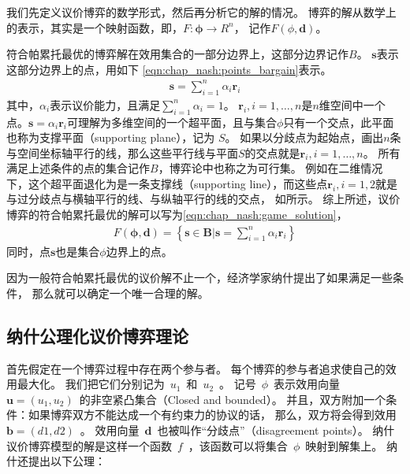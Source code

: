 我们先定义议价博弈的数学形式，然后再分析它的解的情况。
博弈的解从数学上的表示，其实是一个映射函数，即，$F: \mathbf{\phi} \rightarrow R^n$，
记作$F(\phi, \mathbf{d})$。

符合帕累托最优的博弈解在效用集合的一部分边界上，这部分边界记作$B$。
$\mathbf{s}$表示这部分边界上的点，用如下 \eqref{eqn:chap_nash:points_bargain}表示。
\begin{align}
 \mathbf{s} = \sum_{i=1}^n \alpha_i \mathbf{r}_i
    \label{eqn:chap_nash:points_bargain}
\end{align}
其中，$\alpha_i$表示议价能力，且满足$\sum_{i=1}^n \alpha_i = 1$。
$\mathbf{r}_i, i= 1,\dots,n$是$n$维空间中一个点。$\mathbf{s} = \alpha_i \mathbf{r}_i$可理解为多维空间的一个超平面，且与集合$\phi$只有一个交点，此平面也称为支撑平面（supporting plane），记为 $S$。
如果以分歧点为起始点，画出$n$条与空间坐标轴平行的线，那么这些平行线与平面$S$的交点就是$\mathbf{r}_i, i= 1,\dots,n$。
所有满足上述条件的点的集合记作$B$，博弈论中也称之为可行集。
例如在二维情况下，这个超平面退化为是一条支撑线（supporting line），而这些点$\mathbf{r}_i, i= 1,2$就是与过分歧点与横轴平行的线、与纵轴平行的线的交点，
如所示。
综上所述，议价博弈的符合帕累托最优的解可以写为\eqref{eqn:chap_nash:game_solution}，
\begin{align}
    F(\mathbf{\phi},\mathbf{d}) = \left\{ \mathbf{s} \in \mathbf{B} \big \vert \mathbf{s} = \sum_{i=1}^n \alpha_i \mathbf{r}_i \right\}
    \label{eqn:chap_nash:game_solution}
\end{align}
同时，点$\mathbf{s}$也是集合$\phi$边界上的点。

因为一般符合帕累托最优的议价解不止一个，经济学家纳什提出了如果满足一些条件，
那么就可以确定一个唯一合理的解\cite{Nash_1950}。

\subsection{纳什公理化议价博弈理论}
首先假定在一个博弈过程中存在两个参与者。
每个博弈的参与者追求使自己的效用最大化。
我们把它们分别记为~$u_1$~和~$u_2$~。
记号~$\phi$~表示效用向量~$\mathbf{u}=(u_1, u_2)$~的非空紧凸集合（Closed and bounded）。
并且，双方附加一个条件：如果博弈双方不能达成一个有约束力的协议的话，
那么，双方将会得到效用~$\mathbf{b}=(d1, d2)$~。
效用向量~$\mathbf{d}$~也被叫作“分歧点”（disagreement points）。
纳什议价博弈模型的解是这样一个函数~$f$~，该函数可以将集合~$\phi$~映射到解集上。
纳什还提出以下公理：

